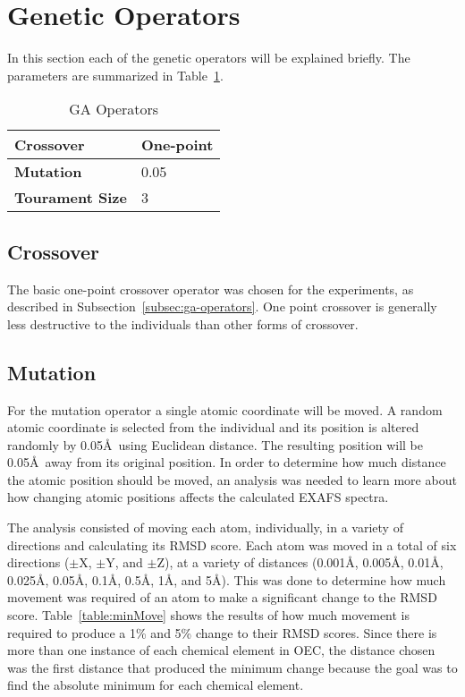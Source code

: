 \section{Genetic Operators}
\label{sec:ga-operators}

In this section each of the genetic operators will be explained briefly. The parameters are summarized in Table~\ref{table:ga-operators}.

\begin{table}[H]
	\centering
	\begin{tabular}{ | l | l | }
		\hline
		\textbf{Crossover} & One-point \\ \hline
		\textbf{Mutation} & 0.05 \\ \hline
		\textbf{Tourament Size} & 3 \\ \hline
	\end{tabular}
	\caption{GA Operators}
	\label{table:ga-operators}
\end{table}

\subsection{Crossover}

The basic one-point crossover operator was chosen for the experiments, as described in Subsection~\ref{subsec:ga-operators}. One point crossover is generally less destructive to the individuals than other forms of crossover. %

\subsection{Mutation}
\label{subsec:mutation}

For the mutation operator a single atomic coordinate will be moved. A random atomic coordinate is selected from the individual and its position is altered randomly by 0.05\AA\  using Euclidean distance. The resulting position will be 0.05\AA\ away from its original position. In order to determine how much distance the atomic position should be moved, an analysis was needed to learn more about how changing atomic positions affects the calculated EXAFS spectra.

The analysis consisted of moving each atom, individually, in a variety of directions and calculating its RMSD score. Each atom was moved in a total of six directions ($\pm$X, $\pm$Y, and $\pm$Z), at a variety of distances (0.001\AA, 0.005\AA, 0.01\AA, 0.025\AA, 0.05\AA, 0.1\AA, 0.5\AA, 1\AA, and 5\AA). This was done to determine how much movement was required of an atom to make a significant change to the RMSD score. Table~\ref{table:minMove} shows the results of how much movement is required to produce a 1\% and 5\% change to their RMSD scores. Since there is more than one instance of each chemical element in OEC, the distance chosen was the first distance that produced the minimum change because the goal was to find the absolute minimum for each chemical element.

